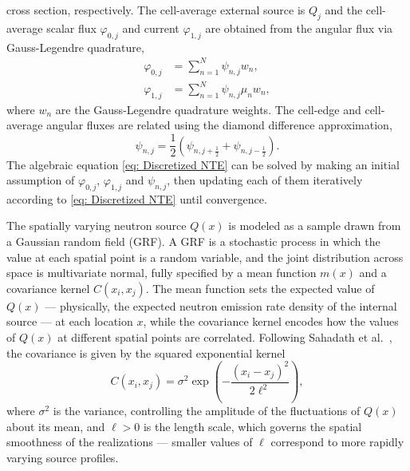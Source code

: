 \documentclass[%
 reprint,
 amsmath,amssymb,
 aps,
]{revtex4-1}
\begin{document}
cross section, respectively. The cell-average external source is $Q_j$ and the cell-average scalar flux $\varphi_{0,j}$ and current $\varphi_{1,j}$
are obtained from the angular flux via Gauss-Legendre quadrature,
\begin{align}
    \varphi_{0,j} &= \sum_{n=1}^N \psi_{n,j} w_n, \label{eq: GL scalar flux} \\
    \varphi_{1,j} &= \sum_{n=1}^N \psi_{n,j} \mu_n w_n,
\end{align}
where $w_n$ are the Gauss-Legendre quadrature weights. The cell-edge and cell-average angular fluxes are related using the diamond difference
approximation,
\begin{equation}
    \psi_{n,j} = \frac{1}{2} \left( \psi_{n, j+\frac{1}{2}} + \psi_{n, j-\frac{1}{2}} \right).
\end{equation}
The algebraic equation \eqref{eq: Discretized NTE} can be solved by making an initial assumption of $\varphi_{0,j}$, $\varphi_{1,j}$ and
$\psi_{n,j}$, then updating each of them iteratively according to \eqref{eq: Discretized NTE} until convergence.

The spatially varying neutron source $Q(x)$ is modeled as a sample drawn from a Gaussian random field (GRF). A GRF is a stochastic process in which
the value at each spatial point is a random variable, and the joint distribution across space is multivariate normal, fully specified by a mean
function $m(x)$ and a covariance kernel $C(x_i, x_j)$. The mean function sets the expected value of $Q(x)$ — physically, the expected neutron
emission rate density of the internal source — at each location $x$, while the covariance kernel encodes how the values of $Q(x)$ at different
spatial points are correlated. Following Sahadath et al.\ \cite{sahadath2026characterization}, the covariance is given by the squared exponential
kernel
\begin{equation}
    C(x_i, x_j) = \sigma^2 \exp\!\left( -\frac{(x_i - x_j)^2}{2 \ell^2} \right),
\end{equation}
where $\sigma^2$ is the variance, controlling the amplitude of the fluctuations of $Q(x)$ about its mean, and $\ell > 0$ is the length scale, which
governs the spatial smoothness of the realizations — smaller values of $\ell$ correspond to more rapidly varying source profiles.
\end{document}
